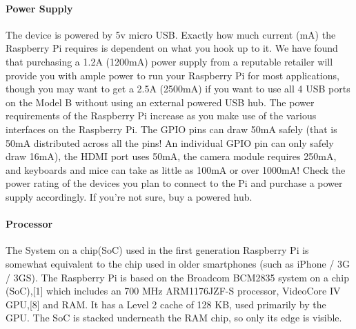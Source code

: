 \documentclass{acm_proc_article-sp}
\begin{document}
 
\paragraph{Power Supply}
The device is powered by 5v micro USB. Exactly how much current (mA) the Raspberry Pi requires is dependent on what you hook up to it. We have found that purchasing a 1.2A (1200mA) power supply from a reputable retailer will provide you with ample power to run your Raspberry Pi for most applications, though you may want to get a 2.5A (2500mA) if you want to use all 4 USB ports on the Model B without using an external powered USB hub.
\newline
\newline
The power requirements of the Raspberry Pi increase as you make use of the various interfaces on the Raspberry Pi. The GPIO pins can draw 50mA safely (that is 50mA distributed across all the pins! An individual GPIO pin can only safely draw 16mA), the HDMI port uses 50mA, the camera module requires 250mA, and keyboards and mice can take as little as 100mA or over 1000mA! Check the power rating of the devices you plan to connect to the Pi and purchase a power supply accordingly. If you’re not sure, buy a powered hub.

\paragraph{Processor}
The System on a chip(SoC) used in the first generation Raspberry Pi is somewhat equivalent to the chip used in older smartphones (such as iPhone / 3G / 3GS). The Raspberry Pi is based on the Broadcom BCM2835 system on a chip (SoC),[1] which includes an 700 MHz ARM1176JZF-S processor, VideoCore IV GPU,[8] and RAM. It has a Level 2 cache of 128 KB, used primarily by the GPU. The SoC is stacked underneath the RAM chip, so only its edge is visible.
\end{document}
